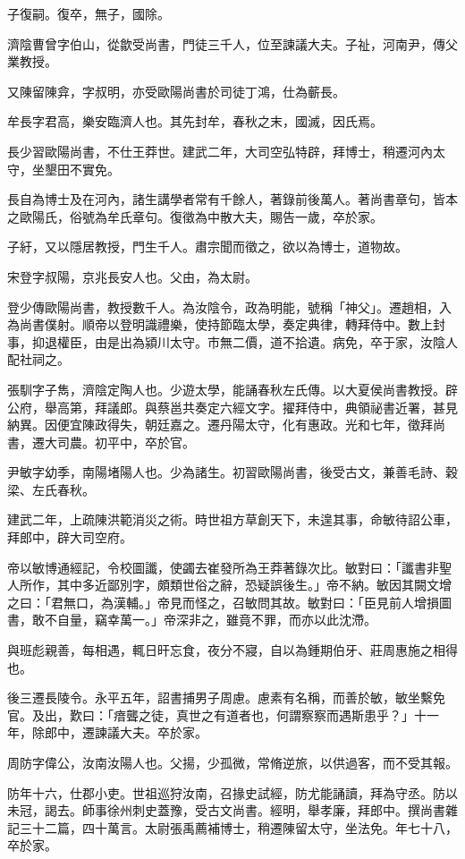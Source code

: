 \begin{pinyinscope}
子復嗣。復卒，無子，國除。

濟陰曹曾字伯山，從歙受尚書，門徒三千人，位至諫議大夫。子祉，河南尹，傳父業教授。

又陳留陳弇，字叔明，亦受歐陽尚書於司徒丁鴻，仕為蘄長。

牟長字君高，樂安臨濟人也。其先封牟，春秋之末，國滅，因氏焉。

長少習歐陽尚書，不仕王莽世。建武二年，大司空弘特辟，拜博士，稍遷河內太守，坐墾田不實免。

長自為博士及在河內，諸生講學者常有千餘人，著錄前後萬人。著尚書章句，皆本之歐陽氏，俗號為牟氏章句。復徵為中散大夫，賜告一歲，卒於家。

子紆，又以隱居教授，門生千人。肅宗聞而徵之，欲以為博士，道物故。

宋登字叔陽，京兆長安人也。父由，為太尉。

登少傳歐陽尚書，教授數千人。為汝陰令，政為明能，號稱「神父」。遷趙相，入為尚書僕射。順帝以登明識禮樂，使持節臨太學，奏定典律，轉拜侍中。數上封事，抑退權臣，由是出為潁川太守。市無二價，道不拾遺。病免，卒于家，汝陰人配社祠之。

張馴字子雋，濟陰定陶人也。少遊太學，能誦春秋左氏傳。以大夏侯尚書教授。辟公府，舉高第，拜議郎。與蔡邕共奏定六經文字。擢拜侍中，典領祕書近署，甚見納異。因便宜陳政得失，朝廷嘉之。遷丹陽太守，化有惠政。光和七年，徵拜尚書，遷大司農。初平中，卒於官。

尹敏字幼季，南陽堵陽人也。少為諸生。初習歐陽尚書，後受古文，兼善毛詩、穀梁、左氏春秋。

建武二年，上疏陳洪範消災之術。時世祖方草創天下，未遑其事，命敏待詔公車，拜郎中，辟大司空府。

帝以敏博通經記，令校圖讖，使蠲去崔發所為王莽著錄次比。敏對曰：「讖書非聖人所作，其中多近鄙別字，頗類世俗之辭，恐疑誤後生。」帝不納。敏因其闕文增之曰：「君無口，為漢輔。」帝見而怪之，召敏問其故。敏對曰：「臣見前人增損圖書，敢不自量，竊幸萬一。」帝深非之，雖竟不罪，而亦以此沈滯。

與班彪親善，每相遇，輒日旰忘食，夜分不寢，自以為鍾期伯牙、莊周惠施之相得也。

後三遷長陵令。永平五年，詔書捕男子周慮。慮素有名稱，而善於敏，敏坐繫免官。及出，歎曰：「瘖聾之徒，真世之有道者也，何謂察察而遇斯患乎？」十一年，除郎中，遷諫議大夫。卒於家。

周防字偉公，汝南汝陽人也。父揚，少孤微，常脩逆旅，以供過客，而不受其報。

防年十六，仕郡小吏。世祖巡狩汝南，召掾史試經，防尤能誦讀，拜為守丞。防以未冠，謁去。師事徐州刺史蓋豫，受古文尚書。經明，舉孝廉，拜郎中。撰尚書雜記三十二篇，四十萬言。太尉張禹薦補博士，稍遷陳留太守，坐法免。年七十八，卒於家。


\end{pinyinscope}
